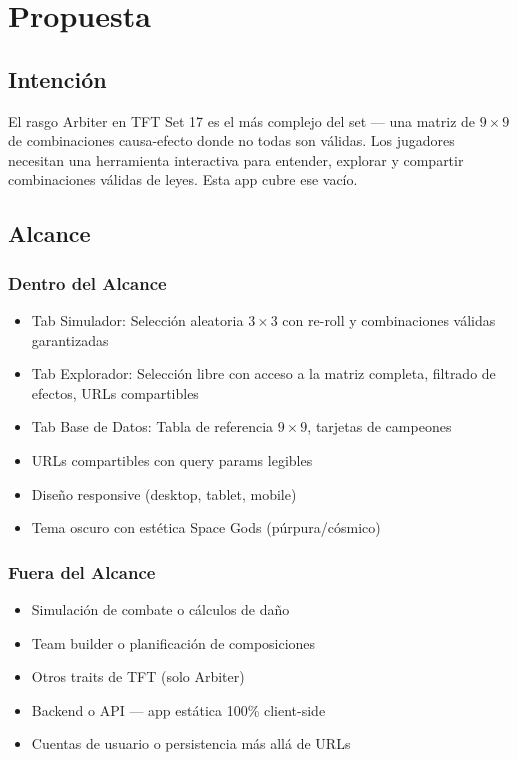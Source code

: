 \documentclass[11pt,a4paper]{report}
\begin{document}
\cleardoublepage

\chapter{Propuesta}

\section{Intención}

El rasgo Arbiter en TFT Set 17 es el más complejo del set — una matriz de $9 \times 9$ de combinaciones causa-efecto donde no todas son válidas. Los jugadores necesitan una herramienta interactiva para entender, explorar y compartir combinaciones válidas de leyes. Esta app cubre ese vacío.

\section{Alcance}

\subsection{Dentro del Alcance}
\begin{itemize}
  \item Tab Simulador: Selección aleatoria $3 \times 3$ con re-roll y combinaciones válidas garantizadas
  \item Tab Explorador: Selección libre con acceso a la matriz completa, filtrado de efectos, URLs compartibles
  \item Tab Base de Datos: Tabla de referencia $9 \times 9$, tarjetas de campeones
  \item URLs compartibles con query params legibles
  \item Diseño responsive (desktop, tablet, mobile)
  \item Tema oscuro con estética Space Gods (púrpura/cósmico)
\end{itemize}

\subsection{Fuera del Alcance}
\begin{itemize}
  \item Simulación de combate o cálculos de daño
  \item Team builder o planificación de composiciones
  \item Otros traits de TFT (solo Arbiter)
  \item Backend o API — app estática 100\% client-side
  \item Cuentas de usuario o persistencia más allá de URLs
\end{itemize}
\end{document}

